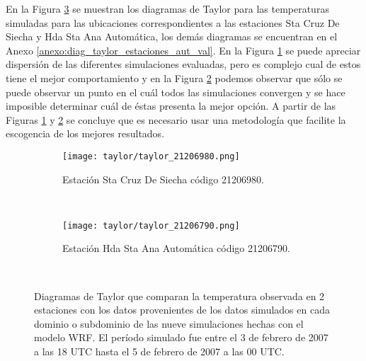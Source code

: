 En la Figura \ref{gra:taylor_total_a} se muestran los diagramas de Taylor para las temperaturas simuladas para las ubicaciones correspondientes a las estaciones Sta Cruz De Siecha y Hda Sta Ana Automática, los demás diagramas se encuentran en el Anexo \ref{anexo:diag_taylor_estaciones_aut_val}. En la Figura \ref{subfig:taylor_11} se puede apreciar dispersión de las diferentes simulaciones evaluadas, pero es complejo cual de estos tiene el mejor comportamiento y en la Figura \ref{subfig:taylor_22} podemos observar que sólo se puede observar un punto en el cuál todos las simulaciones convergen y se hace imposible determinar cuál de éstas presenta la mejor opción. A partir de las Figuras \ref{subfig:taylor_11} y \ref{subfig:taylor_22} se concluye que es necesario usar una metodología que facilite la escogencia de los mejores resultados.\\




%



\begin{figure}[H]
	\begin{center}
	\begin{subfigure}[normla]{0.4\textwidth}
	\caption{Estación Sta Cruz De Siecha código 21206980.}
	\texttt{[image: taylor/taylor\_21206980.png]}
	\label{subfig:taylor_11}
	\end{subfigure}
		~
    \begin{subfigure}[normla]{0.4\textwidth}
    \caption{Estación Hda Sta Ana Automática código 21206790.}
	\texttt{[image: taylor/taylor\_21206790.png]}
	\label{subfig:taylor_22}
	\end{subfigure}
		~
			\end{center}
	\caption{Diagramas de Taylor que comparan la temperatura observada en 2 estaciones con los datos provenientes de los datos simulados en cada dominio o subdominio de las nueve simulaciones hechas con el modelo WRF. El período simulado fue entre el 3 de febrero de 2007 a las 18 UTC hasta el 5 de febrero de 2007 a las 00 UTC.}
	\label{gra:taylor_total_a}	
\end{figure}


